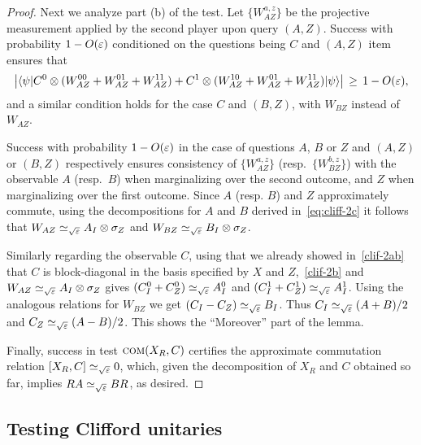 \begin{proof}
Next we analyze part (b) of the test. Let $\{W_{AZ}^{a,z}\}$ be the projective measurement applied by the second player upon query $(A,Z)$. Success with probability $1-O(\varepsilon)$ conditioned on the questions being $C$ and $(A,Z)$ item ensures that 
\begin{equation}\label{clif-2b}
\big| \langle\psi| C^0 \otimes (W_{AZ}^{00} + W_{AZ}^{01} + W_{AZ}^{11}) + C^1\otimes (W_{AZ}^{10} + W_{AZ}^{01} + W_{AZ}^{11}) |\psi\rangle \big| \,\geq\,1-O(\varepsilon),
\end{equation}
and a similar condition holds for the case $C$ and $(B,Z)$, with $W_{BZ}$ instead of $W_{AZ}$. 

Success with probability $1-O(\varepsilon)$ in the case of questions $A$, $B$ or $Z$ and $(A,Z)$ or $(B,Z)$ respectively ensures consistency of $\{W_{AZ}^{a,z}\}$ (resp.\ $\{W_{BZ}^{b,z}\}$) with the observable $A$ (resp.\ $B$) when marginalizing over the second outcome, and $Z$ when marginalizing over the first outcome. Since $A$ (resp. $B$) and $Z$ approximately commute, using the decompositions for $A$ and $B$ derived in~\eqref{eq:cliff-2c} it follows that $W_{AZ} \simeq_{\sqrt{\varepsilon}} A_I \otimes \sigma_Z$ and $W_{BZ} \simeq_{\sqrt{\varepsilon}} B_I \otimes \sigma_Z$. 

Similarly regarding the observable $C$, using that we already showed in~\eqref{clif-2ab} that $C$ is block-diagonal in the basis specified by $X$ and $Z$,~\eqref{clif-2b} and $W_{AZ} \simeq_{\sqrt{\varepsilon}} A_I \otimes \sigma_Z$ gives $(C_I^0 + C_Z^0) \simeq_{\sqrt{\varepsilon}} A_I^0$ and $(C_I^1 + C_Z^1) \simeq_{\sqrt{\varepsilon}} A_I^1$. Using the analogous relations for $W_{BZ}$ we get $(C_I - C_Z) \simeq_{\sqrt{\varepsilon}} B_I$. Thus $C_I \simeq_{\sqrt{\varepsilon}} (A+B)/2$ and $C_Z \simeq_{\sqrt{\varepsilon}} (A-B)/2$. This shows the ``Moreover'' part of the lemma. 

Finally, success in test $\textsc{com}(X_R,C)$ certifies the approximate commutation relation $[X_R,C]\simeq_{\sqrt{\varepsilon}} 0$, which, given the decomposition of $X_R$ and $C$ obtained so far, implies $RA \simeq_{\sqrt{\varepsilon}} B R$, as desired. 
\end{proof}



\subsection{Testing Clifford unitaries}
\label{sec:n-clifford}

